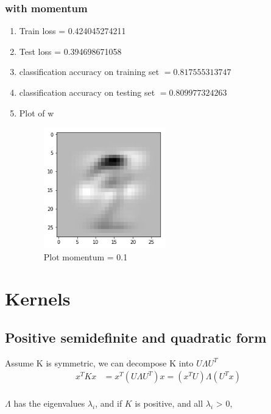 \documentclass[letterpaper, 12pt]{article}
\begin{document}
\subsubsection{with momentum}
\begin{enumerate}
	\item Train loss = 0.424045274211
	\item Test loss = 0.394698671058
	\item classification accuracy on training set $= 0.817555313747$
	\item classification accuracy on testing set $=0.809977324263$
	\item Plot of w
	\begin{figure}[H]
	\centering
	\includegraphics[width=0.5\textwidth]{q_2_3_2.png}
	\caption{\label{}Plot momentum = 0.1 }
	\end{figure}
\end{enumerate}





\section{Kernels}
\subsection{Positive semidefinite and quadratic form}
Assume K is symmetric, we can decompose K into $U \Lambda U^T$
\begin{equation*}
\begin{split}
x^T K x &= x^T (U \Lambda U^T) x = (x^T U) \Lambda (U^T x)\\
\end{split}
\end{equation*}

$\Lambda$ has the eigenvalues $\lambda_{i}$, and if $K$ is positive, and all $\lambda_{i}$ > 0,
\end{document}
